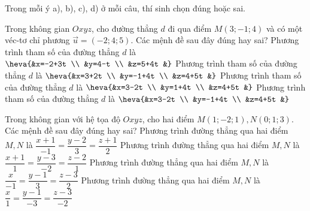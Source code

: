 \TNTF
Trong mỗi ý a), b), c), d) ở mỗi câu, thí sinh chọn đúng hoặc sai.
\begin{ex}%
	Trong không gian $Oxyz$, cho đường thẳng $d$ đi qua điểm $M(3;-1; 4)$ và có một véc-tơ  chỉ phương $\overrightarrow{u}=(-2; 4; 5)$. Các mệnh đề sau đây đúng hay sai?
	\choiceTF
	{Phương trình tham số của đường thẳng $d$ là $\heva{&x=-2+3t \\
			&y=4-t \\
			&z=5+4t
			&}$}
	{Phương trình tham số của đường thẳng $d$ là $\heva{&x=3+2t \\
			&y=-1+4t \\
			&z=4+5t
			&}$}
	{Phương trình tham số của đường thẳng $d$ là $\heva{&x=3-2t \\
			&y=1+4t \\
			&z=4+5t
			&}$}
	{\True Phương trình tham số của đường thẳng $d$ là $\heva{&x=3-2t \\
			&y=-1+4t \\
			&z=4+5t
			&}$}
\end{ex}
\begin{ex}%
	Trong không gian với hệ tọa độ $Oxyz$, cho hai điểm $M(1;-2; 1), N(0; 1; 3)$. Các mệnh đề sau đây đúng hay sai?
	\choiceTF
	{Phương trình đường thẳng qua hai điểm $M, N$ là $\dfrac{x+1}{-1}=\dfrac{y-2}{3}=\dfrac{z+1}{2}$}
	{Phương trình đường thẳng qua hai điểm $M, N$ là $\dfrac{x+1}{1}=\dfrac{y-3}{-2}=\dfrac{z-2}{1}$}
	{\True Phương trình đường thẳng qua hai điểm $M, N$ là $\dfrac{x}{-1}=\dfrac{y-1}{3}=\dfrac{z-3}{2}$}
	{\True Phương trình đường thẳng qua hai điểm $M, N$ là $\dfrac{x}{1}=\dfrac{y-1}{-3}=\dfrac{z-3}{-2}$}
\end{ex}
